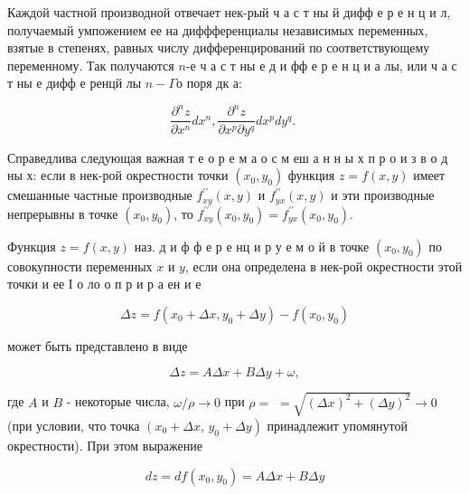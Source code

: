 \documentclass[10pt]{article}
\begin{document}
Каждой частной производной отвечает нек-рый ч а с т ны й дифф е р е н ц и л, получаемый умпожением ее на диффференциалы независимых переменных, взятые в степенях, равных числу дифференцирований по соответствующему переменному. Так получаются $n$-е ч а с т ны е д и фф е р е н ц и а лы, или ч а с т ны е дифф е ренцй лы $n-\Gamma о$ поря дк а:



\[

\frac{\partial^{n} z}{\partial x^{n}} d x^{n}, \frac{\partial^{n} z}{\partial x^{p} \partial y^{q}} d x^{p} d y^{q} \text {. }

\]



Справедлива следующая важная т е о р е м а о с м еш а н н ы х п р о и з в о д ны х: если в нек-рой окрестности точки $\left(x_{0}, y_{0}\right)$ функция $z=f(x, y)$ имеет смешанные частные производные $f_{x y}^{\prime \prime}(x, y)$ и $f_{y x}^{\prime \prime}(x, y)$ и эти производные непрерывны в точке $\left(x_{0}, y_{0}\right)$, то $f_{x y}^{\prime \prime}\left(x_{0}, y_{0}\right)=f_{y x}^{\prime \prime}\left(x_{0}, y_{0}\right)$.



Функция $z=f(x, y)$ наз. д и ф ф е р е нц и р у е м о й в точке $\left(x_{0}, y_{0}\right)$ по совокупности переменных $x$ и $y$, если она определена в нек-рой окрестности этой точки и ее І о ло о п р и р а ен и е



\[

\Delta z=f\left(x_{0}+\Delta x, y_{0}+\Delta y\right)-f\left(x_{0}, y_{0}\right)

\]



может быть представлено в виде



\[

\Delta z=A \Delta x+B \Delta y+\omega,

\]



где $A$ и $B$ - некоторые числа, $\omega / \rho \rightarrow 0$ при $\rho=$ $=\sqrt{(\Delta x)^{2}+(\Delta y)^{2}} \rightarrow 0$ (при условии, что точка $\left(x_{0}+\Delta x\right.$, $\left.y_{0}+\Delta y\right)$ принадлежит упомянутой окрестности). При этом выражение



\[

d z=d f\left(x_{0}, y_{0}\right)=A \Delta x+B \Delta y

\]
\end{document}
